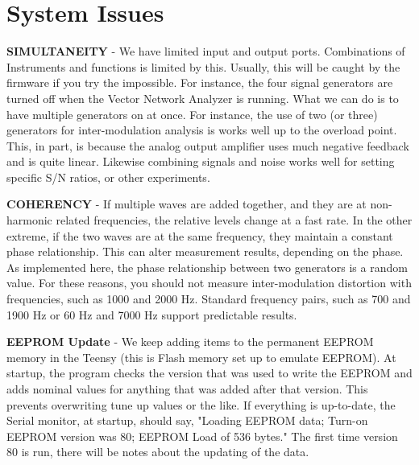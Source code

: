\section{System Issues}
\label{sect:Sys}

\textbf{SIMULTANEITY} - We have limited input and output ports.  Combinations of Instruments and functions is limited by this.  Usually, this will be caught by the firmware if you try the impossible.  For instance, the four signal generators are turned off when the Vector Network Analyzer is running.  What we can do is to have multiple generators on at once.  For instance, the use of two (or three) generators for inter-modulation analysis is works well up to the overload point.  This, in part, is because the analog output amplifier uses much negative feedback and is quite linear.  Likewise combining signals and noise works well for setting specific S/N ratios, or other experiments.

\textbf{COHERENCY} - If multiple waves are added together, and they are at non-harmonic related frequencies, the relative levels change at a fast rate.  In the other extreme, if the two
waves are at the same frequency, they maintain a constant phase relationship. This can alter measurement results, depending on the phase. As implemented here, the phase relationship between two generators is a random  value.  For these reasons, you should not measure inter-modulation distortion with frequencies, such as 1000 and 2000 Hz.  Standard frequency pairs, such as 700 and 1900 Hz or 60 Hz and 7000 Hz support predictable results.

\textbf{EEPROM Update} - We keep adding items to the permanent EEPROM memory in the Teensy (this is Flash memory set up to emulate EEPROM).  At startup, the program checks the version that was used to write the EEPROM and adds nominal values for anything that was added after that version.  This prevents overwriting tune up values or the like.  If everything is up-to-date, the Serial monitor, at startup, should say, "Loading EEPROM data; Turn-on EEPROM version was 80; EEPROM Load of 536 bytes."  The first time version 80 is run, there will be notes about the updating of the data.
